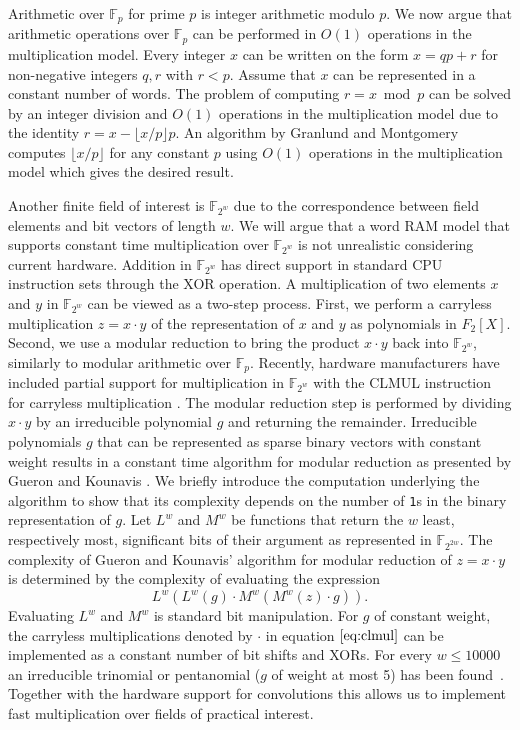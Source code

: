 \documentclass[a4paper,11pt]{article}
\theoremstyle{plain}
\theoremstyle{definition}
\newcommand{\F}{\mathbb{F}}
\begin{document}
Arithmetic over $\F_{p}$ for prime $p$ is integer arithmetic modulo $p$. 
We now argue that arithmetic operations over $\F_{p}$ can be performed in $O(1)$ operations in the multiplication model.
Every integer $x$ can be written on the form $x = qp + r$ for non-negative integers $q, r$ with $r < p$.
Assume that $x$ can be represented in a constant number of words.
The problem of computing $r = x \bmod p$ can be solved by an integer division and $O(1)$ operations in the multiplication model due to the identity $r = x -  \lfloor x/p \rfloor p$.
An algorithm by Granlund and Montgomery \cite{granlund1994} computes $\lfloor x/p \rfloor$ for any constant $p$ using $O(1)$ operations in the multiplication model which gives the desired result.

Another finite field of interest is $\F_{2^{w}}$ due to the correspondence between field elements and bit vectors of length $w$.
We will argue that a word RAM model that supports constant time multiplication over $\F_{2^{w}}$ is not unrealistic considering current hardware.
Addition in $\F_{2^{w}}$ has direct support in standard CPU instruction sets through the XOR operation.
A multiplication of two elements $x$ and $y$ in $\F_{2^{w}}$ can be viewed as a two-step process.
First, we perform a carryless multiplication $z = x \cdot y$ of the representation of $x$ and $y$ as polynomials in $F_{2}[X]$. 
Second, we use a modular reduction to bring the product $x \cdot y$ back into $\F_{2^{w}}$, similarly to modular arithmetic over $\F_{p}$. 
Recently, hardware manufacturers have included partial support for multiplication in $\F_{2^{w}}$ with the CLMUL instruction for carryless multiplication \cite{gueron2014}. 
The modular reduction step is performed by dividing $x \cdot y$ by an irreducible polynomial $g$ and returning the remainder.
Irreducible polynomials $g$ that can be represented as sparse binary vectors with constant weight results in a constant time algorithm for modular reduction as presented by Gueron and Kounavis \cite{gueron2014}.
We briefly introduce the computation underlying the algorithm to show that its complexity depends on the number of {\tt 1}s in the binary representation of $g$.
Let $L^{w}$ and $M^{w}$ be functions that return the $w$ least, respectively most, significant bits of their argument as represented in $\F_{2^{2w}}$.  
The complexity of Gueron and Kounavis' algorithm for modular reduction of $z = x \cdot y$ is determined by the complexity of evaluating the expression
\begin{equation}
L^{w}(L^{w}(g)\cdot M^{w}(M^{w}(z) \cdot g)). \label{eq:clmul}
\end{equation}
Evaluating $L^{w}$ and $M^{w}$ is standard bit manipulation. 
For $g$ of constant weight, the carryless multiplications denoted by $\cdot$ in equation $\eqref{eq:clmul}$ can be implemented as a constant number of bit shifts and XORs. 
For every $w \leq 10000$ an irreducible trinomial or pentanomial ($g$ of weight at most 5) has been found~\cite{seroussi1998}.
Together with the hardware support for convolutions this allows us to implement fast multiplication over fields of practical interest. 
\end{document}
